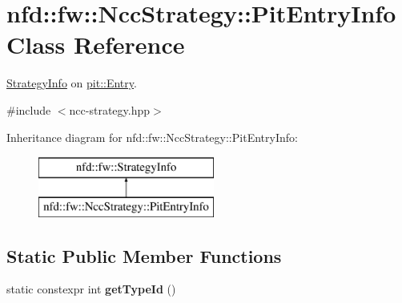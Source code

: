 \hypertarget{classnfd_1_1fw_1_1NccStrategy_1_1PitEntryInfo}{}\section{nfd\+:\+:fw\+:\+:Ncc\+Strategy\+:\+:Pit\+Entry\+Info Class Reference}
\label{classnfd_1_1fw_1_1NccStrategy_1_1PitEntryInfo}


\hyperlink{classnfd_1_1fw_1_1StrategyInfo}{Strategy\+Info} on \hyperlink{classnfd_1_1pit_1_1Entry}{pit\+::\+Entry}.  




{\ttfamily \#include $<$ncc-\/strategy.\+hpp$>$}

Inheritance diagram for nfd\+:\+:fw\+:\+:Ncc\+Strategy\+:\+:Pit\+Entry\+Info\+:\begin{figure}[H]
\begin{center}
\leavevmode
\includegraphics[height=2.000000cm]{classnfd_1_1fw_1_1NccStrategy_1_1PitEntryInfo}
\end{center}
\end{figure}
\subsection*{Static Public Member Functions}
\begin{DoxyCompactItemize}
\item 
static constexpr int {\bfseries get\+Type\+Id} ()\hypertarget{classnfd_1_1fw_1_1NccStrategy_1_1PitEntryInfo_a85ed4e757d26040072a52dd9f003f5a5}{}\label{classnfd_1_1fw_1_1NccStrategy_1_1PitEntryInfo_a85ed4e757d26040072a52dd9f003f5a5}

\end{DoxyCompactItemize}
